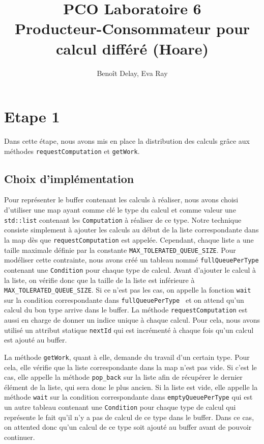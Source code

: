 \documentclass{article}
\title{PCO Laboratoire 6 \\
\large Producteur-Consommateur pour calcul différé (Hoare)}
\author{Benoît Delay, Eva Ray}
\begin{document}
\maketitle

\section{Etape 1}
Dans cette étape, nous avons mis en place la distribution des calculs grâce aux méthodes \texttt{requestComputation} et
\texttt{getWork}.
\subsection{Choix d'implémentation}
Pour représenter le buffer contenant les calculs à réaliser, nous avons choisi d'utiliser une map ayant comme clé le
type du calcul et comme valeur une \texttt{std::list} contenant les \texttt{Computation} à réaliser de ce type. Notre
technique consiste simplement à ajouter les calculs au début de la liste correspondante dans la map dès que
\texttt{requestComputation} est appelée.
Cependant, chaque liste a une taille maximale définie par la constante \texttt{MAX\_TOLERATED\_QUEUE\_SIZE}. Pour
modéliser cette contrainte, nous avons créé un tableau nommé \texttt{fullQueuePerType} contenant une \texttt{Condition}
pour chaque type de calcul.
Avant d'ajouter le calcul à la liste, on vérifie donc que la taille de la liste est inférieure à \texttt{MAX\_TOLERATED\_QUEUE\_SIZE}.
Si ce n'est pas les cas, on appelle la fonction \texttt{wait} sur la condition correspondante dans \texttt{fullQueuePerType
} et on attend qu'un calcul du bon type arrive dans le buffer.
La méthode \texttt{requestComputation} est aussi en charge de donner un indice unique à chaque calcul. Pour cela,
nous avons utilisé un attribut statique \texttt{nextId} qui est incrémenté à chaque fois qu'un calcul est ajouté au
buffer.


La méthode \texttt{getWork}, quant à elle, demande du travail d'un certain type. Pour cela, elle vérifie que la liste
correspondante dans la map n'est pas vide. Si c'est le cas, elle appelle la méthode \texttt{pop\_back} sur la liste
afin de récupérer le dernier élément de la liste, qui sera donc le plus ancien. Si la liste est vide, elle appelle la
méthode \texttt{wait} sur la condition correspondante dans \texttt{emptyQueuePerType} qui est un autre tableau
contenant une \texttt{Condition} pour chaque type de calcul qui représente le fait qu'il n'y a pas de calcul de ce
type dans le buffer. Dans ce cas, on attented donc qu'un calcul de ce type soit ajouté au buffer avant de pouvoir
continuer.
\end{document}

